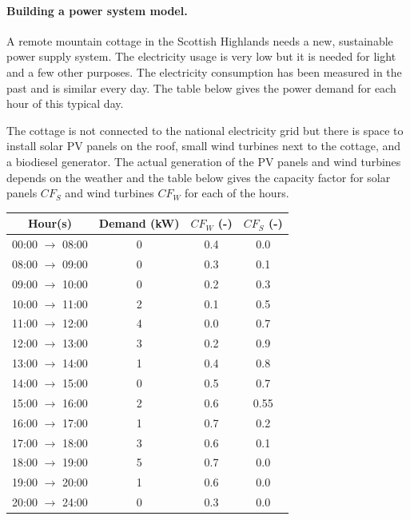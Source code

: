 \paragraph*{Building a power system model.}
\begin{kaobox}[frametitle=Task]
A remote mountain cottage in the Scottish Highlands needs a new, sustainable power supply system. The electricity usage is very low but it is needed for light and a few other purposes. The electricity consumption has been measured in the past and is similar every day. The table below gives the power demand for each hour of this typical day.


The cottage is not connected to the national electricity grid but there is space to install solar PV panels on the roof, small wind turbines next to the cottage, and a biodiesel generator. The actual generation of the PV panels and wind turbines depends on the weather and the table below gives the capacity factor for solar panels  $CF_S$  and wind turbines $CF_W$ for each of the hours.



\begin{tabular}{ c c c c }

	\toprule
	Hour(s) & Demand (kW) & $CF_W$ (-) & $CF_S$ (-) \\
	\midrule
	00:00 $\rightarrow$ 08:00 & 0 & 0.4 & 0.0\\
	08:00 $\rightarrow$ 09:00 & 0 & 0.3 & 0.1\\
	09:00 $\rightarrow$ 10:00 & 0 & 0.2 & 0.3\\
	10:00 $\rightarrow$ 11:00 & 2 & 0.1 & 0.5\\
	11:00 $\rightarrow$ 12:00 & 4 & 0.0 & 0.7\\
	12:00 $\rightarrow$ 13:00 & 3 & 0.2 & 0.9\\
	13:00 $\rightarrow$ 14:00 & 1 & 0.4 & 0.8\\
	14:00 $\rightarrow$ 15:00 & 0 & 0.5 & 0.7\\
	15:00 $\rightarrow$ 16:00 & 2 & 0.6 & 0.55\\
	16:00 $\rightarrow$ 17:00 & 1 & 0.7 & 0.2\\
	17:00 $\rightarrow$ 18:00 & 3 & 0.6 & 0.1\\
	18:00 $\rightarrow$ 19:00 & 5 & 0.7 & 0.0\\
	19:00 $\rightarrow$ 20:00 & 1 & 0.6 & 0.0\\
	20:00 $\rightarrow$ 24:00 & 0 & 0.3 & 0.0\\
	\bottomrule
\end{tabular}\\



\end{kaobox}
